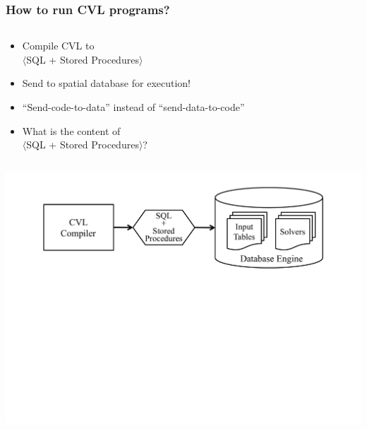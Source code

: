 \documentclass{beamer}
\begin{document}
\begin{frame}[fragile,t]
  \frametitle{How to run CVL programs?}
  \begin{columns}[t]
	\begin{column}[l]{5.5cm}
		\begin{itemize}[<+->]
			\item Compile CVL to \\$\langle$SQL + Stored Procedures$\rangle$
			\item Send to spatial database for execution!
			\item ``Send-code-to-data'' instead of ``send-data-to-code''
			\item What is the content of\\ $\langle$SQL + Stored Procedures$\rangle$?
  		\end{itemize}
	\end{column}
	\begin{column}[r]{5.5cm}
	    \begin{center}
  	    \end{center}
	\end{column}
  \end{columns}
    \begin{center}
  \includegraphics[scale=0.3]{figs/indatabase-execution.pdf}
  \end{center}
\end{frame}


\end{document}
